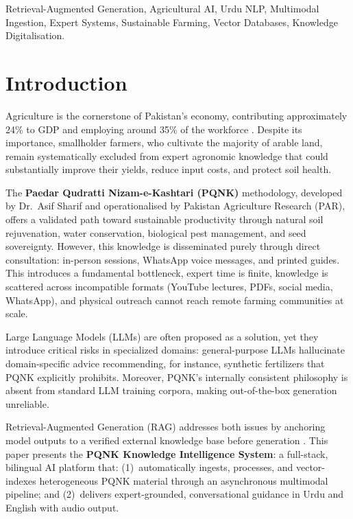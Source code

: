 \documentclass[conference]{IEEEtran}
\begin{document}
\begin{IEEEkeywords}
Retrieval-Augmented Generation, Agricultural AI, Urdu NLP, Multimodal Ingestion, Expert
Systems, Sustainable Farming, Vector Databases, Knowledge Digitalisation.
\end{IEEEkeywords}

\section{Introduction}

Agriculture is the cornerstone of Pakistan's economy, contributing approximately 24\% to GDP
and employing around 35\% of the workforce \cite{pbs2023}. Despite its importance,
smallholder farmers, who cultivate the majority of arable land, remain systematically excluded
from expert agronomic knowledge that could substantially improve their yields, reduce input
costs, and protect soil health.

The \textbf{Paedar Qudratti Nizam-e-Kashtari (PQNK)} methodology, developed by Dr.~Asif
Sharif and operationalised by Pakistan Agriculture Research (PAR), offers a validated
path toward sustainable productivity through natural soil rejuvenation, water conservation,
biological pest management, and seed sovereignty. However, this knowledge is disseminated
purely through direct consultation: in-person sessions, WhatsApp voice messages, and
printed guides. This introduces a fundamental bottleneck, expert time is finite, knowledge
is scattered across incompatible formats (YouTube lectures, PDFs, social media, WhatsApp),
and physical outreach cannot reach remote farming communities at scale.

Large Language Models (LLMs) are often proposed as a solution, yet they introduce critical
risks in specialized domains: general-purpose LLMs hallucinate domain-specific
advice \cite{ji2023survey} recommending, for instance, synthetic fertilizers that PQNK
explicitly prohibits. Moreover, PQNK's internally consistent philosophy is absent from
standard LLM training corpora, making out-of-the-box generation unreliable.

Retrieval-Augmented Generation (RAG) addresses both issues by anchoring model outputs to a
verified external knowledge base before generation \cite{lewis2020rag}. This paper presents
the \textbf{PQNK Knowledge Intelligence System}: a full-stack, bilingual AI platform that:
(1)~automatically ingests, processes, and vector-indexes heterogeneous PQNK material
through an asynchronous multimodal pipeline; and (2)~delivers expert-grounded, conversational guidance in Urdu and English with audio output.
\end{document}
